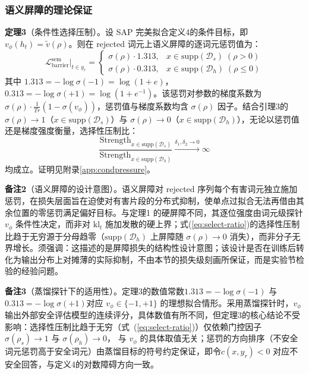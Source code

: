 \documentclass[lettersize,journal]{IEEEtran}
\begin{document}
\subsubsection{语义屏障的理论保证}\label{sec:barrier-theory}
\textbf{定理3}（条件性选择压制）。设 SAP 完美拟合定义4的条件目标，即 $v_\phi(h_t) = \tilde{v}(\rho)$。则在 rejected 词元上语义屏障的逐词元惩罚值为：
\begin{equation}\label{eq:cond-pressure}
\mathcal{L}^{\text{sem}}_{\text{barrier}}\bigg|_{t \in y_r} = \begin{cases}
\sigma(\rho) \cdot 1.313, & x \in \mathrm{supp}(\mathcal{D}_s)\;(\rho > 0)\\
\sigma(\rho) \cdot 0.313, & x \in \mathrm{supp}(\mathcal{D}_h)\;(\rho \leq 0)
\end{cases}
\end{equation}
其中 $1.313 = -\log\sigma(-1) = \log(1+e)$，$0.313 = -\log\sigma(+1) = \log(1+e^{-1})$。该惩罚对参数的梯度系数为 $\sigma(\rho)\cdot \frac{1}{Tr} (1-\sigma(v_\phi))$，惩罚值与梯度系数均含 $\sigma(\rho)$ 因子。结合引理3的 $\sigma(\rho) \to 1$（$x \in \mathrm{supp}(\mathcal{D}_s)$）与 $\sigma(\rho) \to 0$（$x \in \mathrm{supp}(\mathcal{D}_h)$），无论以惩罚值还是梯度强度衡量，选择性压制比：
\begin{equation}\label{eq:select-ratio}
\frac{\text{Strength}_{x \in \mathrm{supp}(\mathcal{D}_s)}}{\text{Strength}_{x \in \mathrm{supp}(\mathcal{D}_h)}} \xrightarrow[]{\delta_1, \delta_2 \to 0} \infty
\end{equation}
均成立。证明见附录\ref{app:condpressure}。

\textbf{备注2}（语义屏障的设计意图）。语义屏障对 rejected 序列每个有害词元独立施加惩罚，在损失层面旨在迫使对有害片段的分布式抑制，使单点过拟合无法再借由其余位置的零惩罚满足偏好目标。与定理1 的硬屏障不同，其逐位强度由词元级探针 $v_\phi$ 条件性决定，而非对 $\mathrm{kl}_t$ 施加发散的硬上界；式(\ref{eq:select-ratio})的选择性压制比趋于无穷源于分母趋零（$\mathrm{supp}(\mathcal{D}_h)$ 上屏障随 $\sigma(\rho)\to0$ 消失），而非分子无界增长。须强调：这描述的是屏障损失的结构性设计意图；该设计是否在训练后转化为输出分布上对摊薄的实际抑制，不由本节的损失级刻画所保证，而是实验节检验的经验问题。

\textbf{备注3}（蒸馏探针下的适用性）。定理3的数值常数$1.313 = -\log\sigma(-1)$ 与 $0.313 = -\log\sigma(+1)$对应 $v_\phi \in \{-1,+1\}$ 的理想拟合情形。采用蒸馏探针时，$v_\phi$ 输出外部安全评估模型的连续评分，具体数值有所不同，但定理3的核心结论不受影响：选择性压制比趋于无穷（式~(\ref{eq:select-ratio})）仅依赖门控因子 $\sigma(\rho_s)\to 1$ 与 $\sigma(\rho_h)\to 0$，
与 $v_\phi$ 的具体取值无关；惩罚的方向排序（不安全词元惩罚高于安全词元）由蒸馏目标的符号约定保证，即令$c(x,y_r)<0$ 对应不安全回答，与定义4的对数障碍方向一致。
\end{document}
